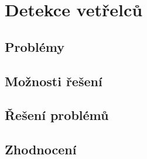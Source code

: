 \section{Detekce vetřelců}\label{sec:detekce-vetrelcu}
\subsection{Problémy}\label{subsec:detekce-vetrelcu-problemy}
\subsection{Možnosti řešení}\label{subsec:detekce-vetrelcu-moznosti-reseni}
\subsection{Řešení problémů}\label{subsec:detekce-vetrelcu-reseni-problemu}
\subsection{Zhodnocení}\label{subsec:detekce-vetrelcu-zhodnoceni}
